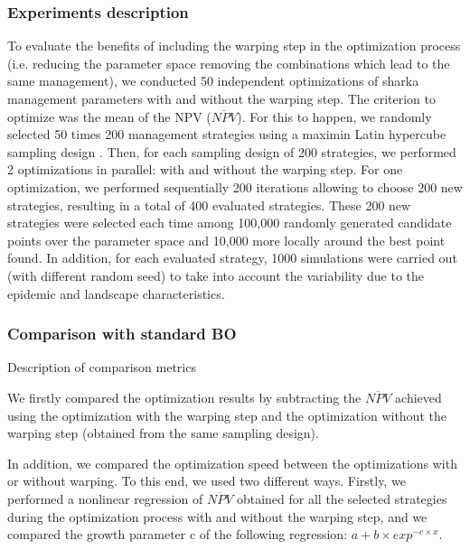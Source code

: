 	\subsubsection{Experiments description}
	
	To evaluate the benefits of including the warping step in the optimization process (i.e. reducing the parameter space removing the combinations which lead to the same management), 
	we conducted 50 independent optimizations of sharka management parameters with and without the warping step. The criterion to optimize was the mean of the NPV ($\overline{NPV}$).
	For this to happen, we randomly selected 50 times 200 management strategies using a maximin Latin hypercube sampling design \cite{fang2005design}. 
	Then, for each sampling design of 200 strategies, we performed 2 optimizations in parallel: with and without the warping step. 
	For one optimization, we performed sequentially 200 iterations allowing to choose 200 new strategies, resulting in a total of 400 evaluated strategies.
	These 200 new strategies were selected each time among 100,000 randomly generated candidate points over the parameter space and 10,000 more locally around the best point found. 
	In addition, for each evaluated strategy, 1000 simulations were carried out (with different random seed) to take into account the variability due to the epidemic and landscape characteristics.
	
	\subsubsection{Comparison with standard BO}
	
	Description of comparison metrics
	
	
	
	We firstly compared the optimization results by subtracting the $\overline{NPV}$ achieved using the optimization with the warping step and the optimization without the warping step (obtained from the same sampling design). 
	
	In addition, we compared the optimization speed between the optimizations with or without warping. To this end, we used two different ways. 
	Firstly, we performed a nonlinear regression of $\overline{NPV}$ obtained for all the selected strategies during the optimization process with 
	and without the warping step, and we compared the growth parameter c of the following regression:
	$a+b \times exp^{-c\times x}$.
	
